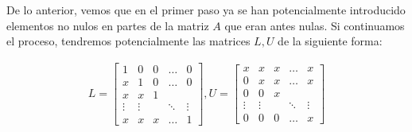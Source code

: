 \documentclass{article}
\begin{document}
\begin{enumerate}
De lo anterior, vemos que en el primer paso ya se han potencialmente introducido elementos no nulos en partes de la matriz $A$ que eran antes nulas. Si continuamos el proceso, tendremos potencialmente las matrices $L,U$ de la siguiente forma:

\begin{gather*}
L = 
	\begin{bmatrix}
		1 & 0 & 0 & \hdots & 0 \\
		x & 1 & 0 & \hdots & 0 \\
		x & x & 1 \\
   \vdots & \vdots && \ddots & \vdots \\
		x & x & x & \hdots & 1
	\end{bmatrix},
U = 
	\begin{bmatrix}
		x & x & x & \hdots & x \\
		0 & x & x & \hdots & x \\
		0 & 0 & x \\
		\vdots & \vdots && \ddots & \vdots \\
		0 & 0 & 0 & \hdots & x
	\end{bmatrix}
\end{gather*}


\end{enumerate}
\end{document}

